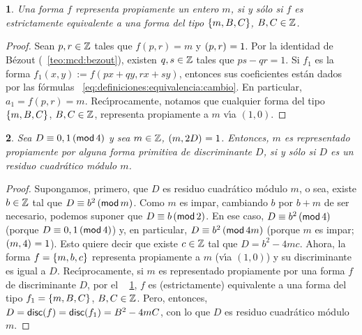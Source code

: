 \theoremstyle{plain}
\newtheorem{teoRepresentaciones}{\teoname}[section]
\newtheorem{lemaRepresentaciones}[teoRepresentaciones]{\lemaname}
\newtheorem{coroRepresentaciones}[teoRepresentaciones]{\coroname}

\theoremstyle{definition}


\begin{lemaRepresentaciones}\label{lema:representaciones:propiamente}
	Una forma $f$ representa propiamente un entero $m$, si y s\'olo
	si $f$ es estrictamente equivalente a una forma del tipo
	$\binaria{m,B,C}$, $B,C\in\Enteros$.
\end{lemaRepresentaciones}

\begin{proof}
	Sean $p,r\in\Enteros$ tales que $f(p,r)=m$ y $\mcd{p,r}=1$. Por
	la identidad de B\'ezout (\teoname~\ref{teo:mcd:bezout}), existen
	$q,s\in\Enteros$ tales que $ps-qr=1$. Si $f_1$ es la forma
	$f_1(x,y):=f(px+qy,rx+sy)$, entonces sus coeficientes est\'an
	dados por las f\'ormulas~%
	\eqref{eq:definiciones:equivalencia:cambio}. En particular,
	$a_1=f(p,r)=m$. Rec\'{\i}procamente, notamos que cualquier
	forma del tipo $\binaria{m,B,C}$, $B,C\in\Enteros$, representa
	propiamente a $m$ v\'{\i}a $(1,0)$.
\end{proof}

\begin{lemaRepresentaciones}\label{lema:representaciones:primitiva}
	Sea $D\equiv 0,1\tmodulo[4]$ y sea $m\in\Enteros$,
	$\mcd{m,2D}=1$. Entonces, $m$ es representado propiamente
	por \emph{alguna} forma primitiva de discriminante $D$,
	si y s\'olo si $D$ es un residuo cuadr\'atico m\'odulo $m$.
\end{lemaRepresentaciones}

\begin{proof}
	Supongamos, primero, que $D$ es residuo cuadr\'atico m\'odulo
	$m$, o sea, existe $b\in\Enteros$ tal que $D\equiv b^2\tmodulo[m]$.
	Como $m$ es impar, cambiando $b$ por $b+m$ de ser necesario,
	podemos suponer que $D\equiv b\tmodulo[2]$. En ese caso,
	$D\equiv b^2\tmodulo[4]$ (porque $D\equiv 0,1\tmodulo[4]$) y,
	en particular, $D\equiv b^2\tmodulo[4m]$ (porque $m$ es impar;
	$\mcd{m,4}=1$). Esto quiere decir que existe $c\in\Enteros$ tal
	que $D=b^2-4mc$. Ahora, la forma $f=\binaria{m,b,c}$ representa
	propiamente a $m$ (v\'{\i}a $(1,0)$) y su discriminante es igual a
	$D$. Rec\'{\i}procamente, si $m$ es representado propiamente por
	una forma $f$ de discriminante $D$, por el \lemaname~%
	\ref{lema:representaciones:propiamente}, $f$ es (estrictamente)
	equivalente a una forma del tipo $f_1=\binaria{m,B,C}$,
	$B,C\in\Enteros$. Pero, entonces,
	\begin{math}
		D=\discriminante(f)=\discriminante(f_1)=B^2-4mC
	\end{math},
	con lo que $D$ es residuo cuadr\'atico m\'odulo $m$.
\end{proof}

